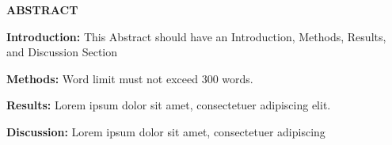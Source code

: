 \noindent \textbf{\large ABSTRACT}
    
\noindent \textbf{Introduction:} 
This Abstract should have an Introduction, Methods, Results, and Discussion Section
    
\noindent \textbf{Methods:} 
Word limit must not exceed 300 words.
  
\noindent \textbf{Results:} 
Lorem ipsum dolor sit amet, consectetuer adipiscing elit. 
  
\noindent \textbf{Discussion:} 
Lorem ipsum dolor sit amet, consectetuer adipiscing